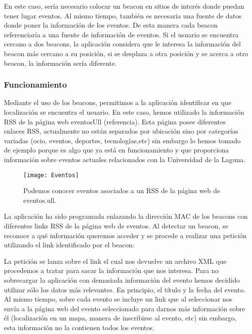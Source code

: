 En este caso, sería necesario colocar un beacon en sitios de interés donde puedan tener lugar eventos. Al mismo tiempo, también es necesaria una fuente de datos donde poner la información de los eventos. De esta manera cada beacon referenciaría a una fuente de información de eventos. Si el usuario se encuentra cercano a dos beacons, la aplicación considera que le interesa la información del beacon más cercano a su posición, si se desplaza a otra posición y se acerca a otro beacon, la información sería diferente.

\subsubsection{Funcionamiento}


Mediante el uso de los beacons, permitimos a la aplicación identificar en que localización se encuentra el usuario. En este caso, hemos utilizado la información RSS de la página web eventosUll (referencia). Esta página posee diferentes enlaces RSS, actualmente no están separados por ubicación sino por categorías variadas (ocio, eventos, deportes, tecnologías,etc) sin embargo lo hemos tomado de ejemplo porque es algo que ya está en funcionamiento y que proporciona información sobre eventos actuales relacionados con la Universidad de la Laguna. 


\begin{figure}[H]
	\centering
	\texttt{[image: Eventos]}
	\caption{Podemos conocer eventos asociados a un RSS de la página web de eventos.ull.}
	\label{fig:eventos}
\end{figure}

La aplicación ha sido programada enlazando la dirección MAC de los beacons con diferentes links RSS de la página web de eventos. Al detectar un beacon, se reconoce a qué información queremos acceder y se procede a realizar una petición utilizando el link identificado por el beacon: 


La petición se lanza sobre el link el cual nos devuelve un archivo XML que procedemos a tratar para sacar la información que nos interesa. Para no sobrecargar la aplicación con demasiada información del evento hemos decidido utilizar sólo los datos más relevantes. En principio, el título y la fecha del evento. Al mismo tiempo, sobre cada evento se incluye un link que al seleccionar nos envía a la página web del evento seleccionado para darnos más información sobre él (localización en un mapa, manera de inscribirse al evento, etc) sin embargo, esta información no la contienen todos los eventos.


